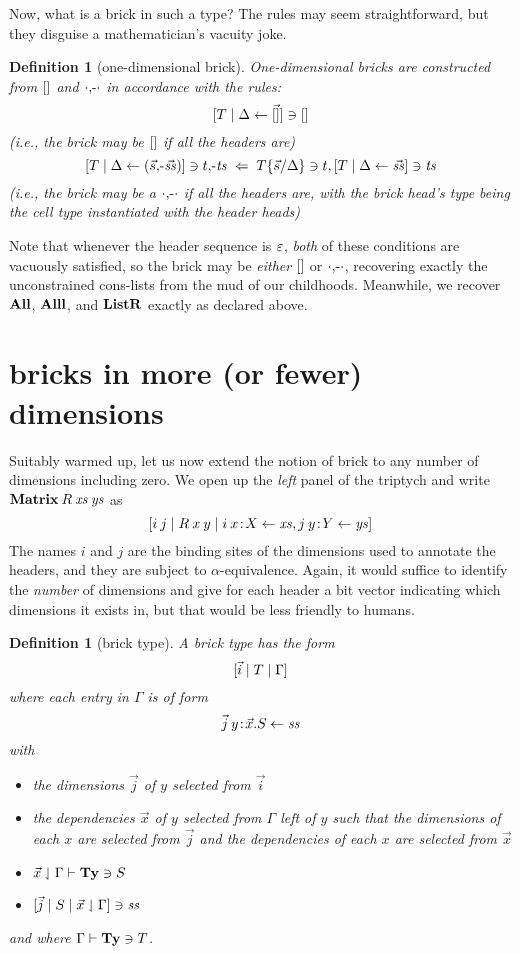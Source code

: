 \documentclass{article}
\newtheorem{defn}[thm]{Definition}
\begin{document}
Now, what is a brick in such a type? The rules may seem straightforward, but they disguise a mathematician's vacuity joke.
\begin{defn}[one-dimensional brick]
  One-dimensional bricks are constructed from $[]$ and $\cdot\mbox{$,\!\textrm{-}$}\cdot$ in accordance with the rules:
  \[
  [T\;|\;\Delta\leftarrow\vec{[]}]\ni[]
  \]
  (i.e., the brick may be $[]$ if all the headers are)
  \[
    [T\;|\;\Delta\leftarrow(\vec s\mbox{$,\!\textrm{-}$}\vec{\mathit{ss}})]\ni t\mbox{$,\!\textrm{-}$}\mathit{ts} \;\Leftarrow\;
    T\{\vec s/\Delta\}\ni t, [T\;|\;\Delta\leftarrow\vec{\mathit{ss}}]\ni \mathit{ts}
  \]
  (i.e., the brick may be a $\cdot\mbox{$,\!\textrm{-}$}\cdot$ if all the headers are, with the brick head's type being the cell type instantiated with the header heads)
\end{defn}
Note that whenever the header sequence is $\varepsilon$, \emph{both} of these conditions are vacuously satisfied, so the brick may be \emph{either} $[]$ or $\cdot\mbox{$,\!\textrm{-}$}\cdot$, recovering exactly the unconstrained cons-lists from the mud of our childhoods. Meanwhile, we recover $\mathbf{All}$, $\mathbf{Alll}$, and $\mathbf{ListR}$ exactly as declared above.


\section{bricks in more (or fewer) dimensions}

Suitably warmed up, let us now extend the notion of brick to any number of dimensions including zero. We open up the \emph{left} panel of the triptych and write $\mathbf{Matrix}\:R\:\mathit{xs}\:\mathit{ys}$ as
\[
[i\: j\;|\; R\:x\:y \;|\; i\: x\!:\! X\leftarrow\mathit{xs}, j\: y\!:\! Y\leftarrow\mathit{ys}]
\]
The names $i$ and $j$ are the binding sites of the dimensions used to annotate the headers, and they are subject to $\alpha$-equivalence. Again, it would suffice to identify the \emph{number} of dimensions and give for each header a bit vector indicating which dimensions it exists in, but that would be less friendly to humans.

\begin{defn}[brick type]
  A brick type has the form
  \[
  [\vec i \;|\; T \;|\; \Gamma]
  \]
  where each entry in $\Gamma$ is of form
  \[
  \vec j\: y\!:\!\vec x.S\leftarrow \mathit{ss}
  \]
  with
  \begin{itemize}
  \item the dimensions $\vec j$ of $y$ selected from $\vec i$
  \item the dependencies $\vec x$ of $y$ selected from $\Gamma$ left of $y$ such that the dimensions of each $x$ are selected from $\vec j$ and the dependencies of each $x$ are selected from $\vec x$
  \item $\vec x\downharpoonleft\Gamma \vdash \mathbf{Ty} \ni S$
  \item $[\vec j\;|\; S\;|\; \vec x\downharpoonleft\Gamma] \ni \mathit{ss}$
  \end{itemize}
  and where $\Gamma\vdash \mathbf{Ty}\ni T$.
\end{defn}
\end{document}
